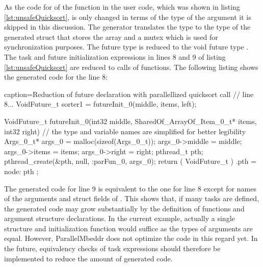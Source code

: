 As the code for of the  function in the user code, which was shown in listing \ref{lst:unsafeQuicksort}, is only changed in terms of the type of the  argument it is skipped in this discussion. The generator translates the type  to the type of the generated struct  that stores the array and a mutex which is used for synchronization purposes. The future type  is reduced to the void future type . The task and future initialization expressions in lines 8 and 9 of listing \ref{lst:unsafeQuicksort} are reduced to calls of  functions. The following listing shows the generated code for the line 8:
\begin{ccode}{caption=Reduction of future declaration with parallellized quicksort call}
  // line 8...
  VoidFuture_t sorter1 = futureInit_0(middle, items, left);

VoidFuture_t futureInit_0(int32 middle, SharedOf_ArrayOf_Item_0_t* items, int32 right) {
  // the type and variable names are simplified for better legibility
  Args_0_t* args_0 = malloc(sizeof(Args_0_t)); 
  args_0->middle = middle; 
  args_0->items = items; 
  args_0->right = right; 
  pthread_t pth; 
  pthread_create(&pth, null, :parFun_0, args_0); 
  return ( VoidFuture_t ){ .pth = node: pth }; 
}
\end{ccode}
The generated code for line 9 is equivalent to the one for line 8 except for names of the arguments and struct fields of . This shows that, if many tasks are defined, the generated code may grow substantially by the definition of  functions and argument structure declarations. In the current example, actually a single structure and initialization function would suffice as the types of arguments are equal. However, ParallelMbeddr does not optimize the code in this regard yet. In the future, equivalency checks of task expressions should therefore be implemented to reduce the amount of generated code.

